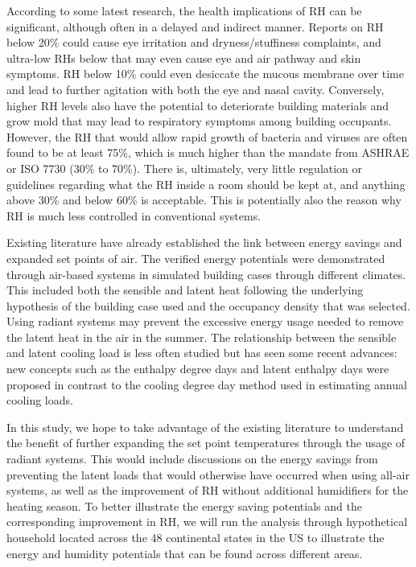 According to some latest research, the health implications of RH can be significant, although often in a delayed and indirect manner. Reports on RH below 20\% could cause eye irritation and dryness/stuffiness complaints, and ultra-low RHs below that may even cause eye and air pathway and skin symptoms. RH below 10\% could even desiccate the mucous membrane over time and lead to further agitation with both the eye and nasal cavity\cite{sunwoo_physiological_2006-1}. Conversely, higher RH levels also have the potential to deteriorate building materials and grow mold that may lead to respiratory symptoms among building occupants. However, the RH that would allow rapid growth of bacteria and viruses are often found to be at least 75\%, which is much higher than the mandate from ASHRAE or ISO 7730 (30\% to 70\%). There is, ultimately, very little regulation or guidelines regarding what the RH inside a room should be kept at, and anything above 30\% and below 60\% is acceptable. This is potentially also the reason why RH is much less controlled in conventional systems.

Existing literature have already established the link between energy savings and expanded set points of air\cite{hoyt_extending_2015}. The verified energy potentials were demonstrated through air-based systems in simulated building cases through different climates. This included both the sensible and latent heat following the underlying hypothesis of the building case used and the occupancy density that was selected. Using radiant systems may prevent the excessive energy usage needed to remove the latent heat in the air in the summer. The relationship between the sensible and latent cooling load is less often studied but has seen some recent advances: new concepts such as the enthalpy degree days \cite{krese_incorporation_2011} and latent enthalpy days were proposed in contrast to the cooling degree day method used in estimating annual cooling loads\cite{huang_climatic_1986}.

In this study, we hope to take advantage of the existing literature to understand the benefit of further expanding the set point temperatures through the usage of radiant systems. This would include discussions on the energy savings from preventing the latent loads that would otherwise have occurred when using all-air systems, as well as the improvement of RH without additional humidifiers for the heating season.  To better illustrate the energy saving potentials and the corresponding improvement in RH, we will run the analysis through hypothetical household located across the 48 continental states in the US to illustrate the energy and humidity potentials that can be found across different areas. 
